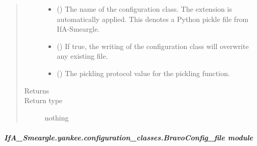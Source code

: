 \documentclass[letterpaper,10pt,english]{sphinxmanual}
\begin{document}
\begin{fulllineitems}
\begin{fulllineitems}
\begin{quote}
\begin{description}
\begin{itemize}
\item {} 
 () \textendash{} The name of the configuration class. The extension 
is automatically applied. This denotes a Python pickle file from
IfA-Smeargle.

\item {} 
 () \textendash{} If true, the writing of the configuration class will overwrite any
existing file.

\item {} 
 () \textendash{} The pickling protocol value for the pickling function.

\end{itemize}

\item[{Returns}] \leavevmode


\item[{Return type}] \leavevmode
nothing

\end{description}\end{quote}

\end{fulllineitems}


\end{fulllineitems}



\subparagraph{IfA\_Smeargle.yankee.configuration\_classes.BravoConfig\_file module}
\label{\detokenize{python_docstrings/IfA_Smeargle.yankee.configuration_classes.BravoConfig_file:module-IfA_Smeargle.yankee.configuration_classes.BravoConfig_file}}\label{\detokenize{python_docstrings/IfA_Smeargle.yankee.configuration_classes.BravoConfig_file:ifa-smeargle-yankee-configuration-classes-bravoconfig-file-module}}\label{\detokenize{python_docstrings/IfA_Smeargle.yankee.configuration_classes.BravoConfig_file::doc}}
\end{document}
